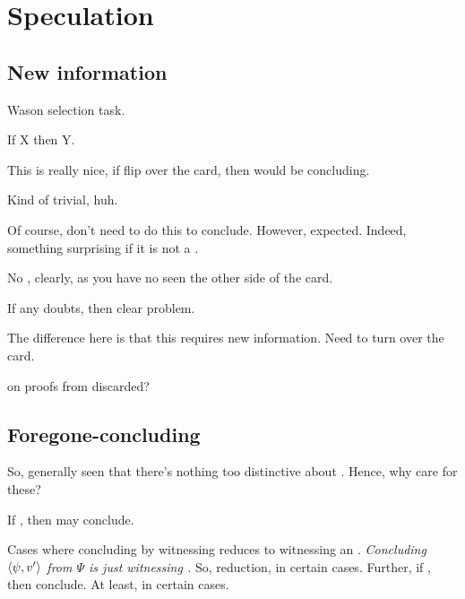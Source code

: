 \chapter{Speculation}
\label{cha:speculation}

\section{New information}

\begin{note}
  \begin{scenario}
    Wason selection task.

    If X then Y.
  \end{scenario}

  This is really nice, if flip over the card, then would be concluding.

  Kind of trivial, huh.

  Of course, don't need to do this to conclude.
  However, expected.
  Indeed, something surprising if it is not a \fc{}.

  No \wit{}, clearly, as you have no seen the other side of the card.

  If any doubts, then clear problem.

  The difference here is that this requires new information.
  Need to turn over the card.
\end{note}

\begin{note}
  \citeauthor{Easwaran:2009tm} on proofs from discarded?
\end{note}

\section{Foregone-concluding}

\begin{note}
  So, generally seen that there's nothing too distinctive about .
  Hence, why care for these?

  \begin{idea}
    \label{idea:reassignment}
    If \fc{}, then may conclude.
  \end{idea}

  Cases where concluding by witnessing reduces to witnessing an \fc{}.
  \emph{Concluding \(\langle \psi, v' \rangle\) from \(\Psi\) is just witnessing \fc{}.}
  So, reduction, in certain cases.
  Further, if \fc{}, then conclude.
  At least, in certain cases.
\end{note}


